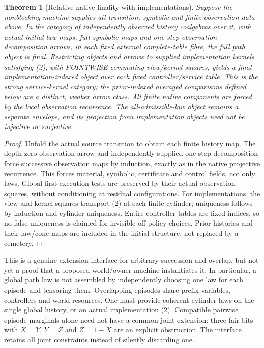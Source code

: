 \documentclass{article}
\newtheorem{theorem}{Theorem}\newtheorem{proposition}{Proposition}
\begin{document}
\begin{theorem}[Relative native finality with implementations]
Suppose the nonblocking machine supplies all transition, symbolic and finite observation data above. In the category of independently observed history coalgebras over it, with actual initial-law maps, full symbolic maps and one-step observation decomposition arrows, in each fixed external complete-table fibre, the full path object is final. Restricting objects and arrows to supplied implementation kernels satisfying (2), with POINTWISE commuting view/kernel squares, yields a final implementation-indexed object over each fixed controller/service table. This is the strong service-kernel category; the prior-indexed averaged comparisons defined below are a distinct, weaker arrow class. All finite native components are forced by the local observation recurrence. The all-admissible-law object remains a separate envelope, and its projection from implementation objects need not be injective or surjective.
\end{theorem}
\begin{proof}
Unfold the actual source transition to obtain each finite history map. The depth-zero observation arrow and independently supplied one-step decomposition force successive observation maps by induction, exactly as in the native projective recurrence. This forces material, symbolic, certificate and control fields, not only laws. Global first-execution tests are preserved by their actual observation squares, without conditioning at residual configurations. For implementations, the view and kernel squares transport (2) at each finite cylinder; uniqueness follows by induction and cylinder uniqueness. Entire controller tables are fixed indices, so no false uniqueness is claimed for invisible off-policy choices. Prior histories and their law/cone maps are included in the initial structure, not replaced by a cemetery.
\end{proof}

This is a genuine extension interface for arbitrary succession and overlap, but not yet a proof that a proposed world/owner machine instantiates it. In particular, a global path law is not assembled by independently choosing one law for each episode and tensoring them. Overlapping episodes share prefix variables, controllers and world resources. One must provide coherent cylinder laws on the single global history, or an actual implementation (2). Compatible pairwise episode marginals alone need not have a common joint extension: three fair bits with $X=Y$, $Y=Z$ and $Z=1-X$ are an explicit obstruction. The interface retains all joint constraints instead of silently discarding one.
\end{document}
